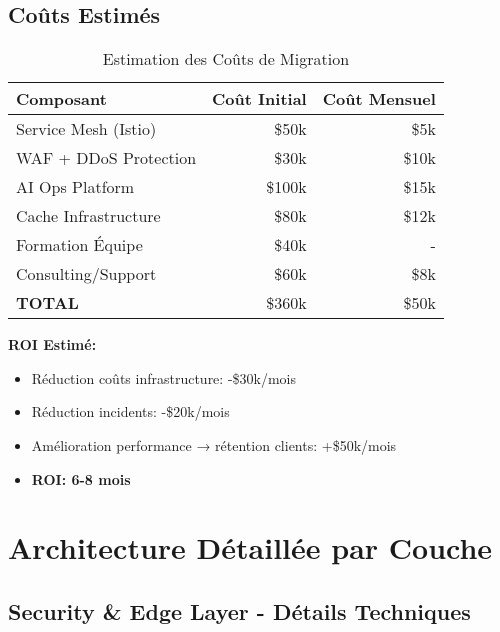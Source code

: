 \documentclass[12pt,a4paper]{article}
\begin{document}
\subsection{Coûts Estimés}

\begin{table}[h]
\centering
\begin{tabular}{|l|r|r|}
\hline
\textbf{Composant} & \textbf{Coût Initial} & \textbf{Coût Mensuel} \\
\hline
Service Mesh (Istio) & \$50k & \$5k \\
WAF + DDoS Protection & \$30k & \$10k \\
AI Ops Platform & \$100k & \$15k \\
Cache Infrastructure & \$80k & \$12k \\
Formation Équipe & \$40k & - \\
Consulting/Support & \$60k & \$8k \\
\hline
\textbf{TOTAL} & \$360k & \$50k \\
\hline
\end{tabular}
\caption{Estimation des Coûts de Migration}
\end{table}

\textbf{ROI Estimé:}
\begin{itemize}[noitemsep]
    \item Réduction coûts infrastructure: -\$30k/mois
    \item Réduction incidents: -\$20k/mois
    \item Amélioration performance → rétention clients: +\$50k/mois
    \item \textbf{ROI: 6-8 mois}
\end{itemize}

\newpage
\section{Architecture Détaillée par Couche}

\subsection{Security \& Edge Layer - Détails Techniques}
\end{document}
